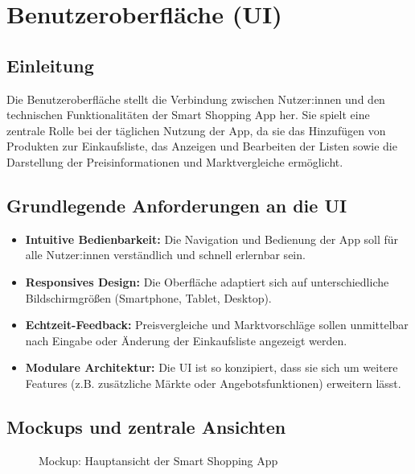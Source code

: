 \documentclass[12pt, a4paper]{report} %
\newcommand{\authorinitials}{} %
\begin{document}
\chapter{Benutzeroberfläche (UI)}
\renewcommand{\authorinitials}{NK}
\label{chap:ui}

\section{Einleitung}
Die Benutzeroberfläche stellt die Verbindung zwischen Nutzer:innen und den technischen Funktionalitäten der Smart Shopping App her. Sie spielt eine zentrale Rolle bei der täglichen Nutzung der App, da sie das Hinzufügen von Produkten zur Einkaufsliste, das Anzeigen und Bearbeiten der Listen sowie die Darstellung der Preisinformationen und Marktvergleiche ermöglicht.

\section{Grundlegende Anforderungen an die UI}
\begin{itemize}
    \item \textbf{Intuitive Bedienbarkeit:} Die Navigation und Bedienung der App soll für alle Nutzer:innen verständlich und schnell erlernbar sein.
    \item \textbf{Responsives Design:} Die Oberfläche adaptiert sich auf unterschiedliche Bildschirmgrößen (Smartphone, Tablet, Desktop).
    \item \textbf{Echtzeit-Feedback:} Preisvergleiche und Marktvorschläge sollen unmittelbar nach Eingabe oder Änderung der Einkaufsliste angezeigt werden.
    \item \textbf{Modulare Architektur:} Die UI ist so konzipiert, dass sie sich um weitere Features (z.B. zusätzliche Märkte oder Angebotsfunktionen) erweitern lässt.
\end{itemize}

\section{Mockups und zentrale Ansichten}
\begin{figure}[h!]
    \centering
    \caption{Mockup: Hauptansicht der Smart Shopping App}
    \label{fig:ui_mockup}
\end{figure}
\end{document}

